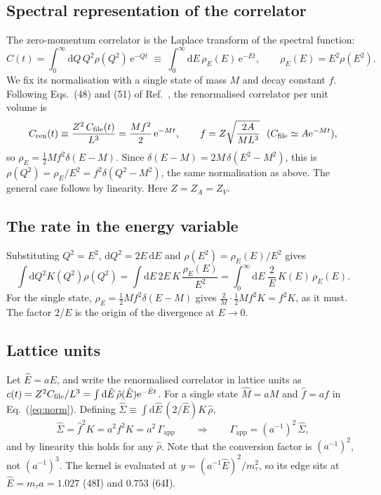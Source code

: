 \documentclass[11pt]{article}
\newcommand{\dd}{\mathrm{d}}
\newcommand{\ee}{\mathrm{e}}
\newcommand{\Gapp}{\Gamma_{\mathrm{app}}}
\theoremstyle{remark}
\begin{document}
\subsection{Spectral representation of the correlator}
The zero-momentum correlator is the Laplace transform of the spectral function:
\begin{equation}
 C(t)=\int_0^\infty\dd Q\,Q^2\rho(Q^2)\,\ee^{-Qt}\;\equiv\;\int_0^\infty\dd E\,\rho_E(E)\,\ee^{-Et},\qquad \rho_E(E)=E^2\rho(E^2).
 \label{eq:spec}
\end{equation}
We fix its normalisation with a single state of mass $M$ and decay constant $f$. Following Eqs.~(48) and (51) of Ref.~\cite{Chen:TauNote}, the renormalised correlator per unit volume is
\begin{equation}
 C_{\rm ren}(t)\equiv\frac{Z^2\,C_{\rm file}(t)}{L^3}=\frac{Mf^2}{2}\,\ee^{-Mt},
 \qquad f=Z\sqrt{\frac{2A}{ML^3}}\ \ (C_{\rm file}\simeq A\ee^{-Mt}),
 \label{eq:norm}
\end{equation}
so $\rho_E=\tfrac12Mf^2\delta(E-M)$. Since $\delta(E-M)=2M\,\delta(E^2-M^2)$, this is
$\rho(Q^2)=\rho_E/E^2=f^2\delta(Q^2-M^2)$, the same normalisation as above. The general case follows by linearity. Here $Z=Z_A=Z_V$.

\subsection{The rate in the energy variable}
Substituting $Q^2=E^2$, $\dd Q^2=2E\,\dd E$ and $\rho(E^2)=\rho_E(E)/E^2$ gives
\begin{equation}
 \int\dd Q^2K(Q^2)\rho(Q^2)=\int\dd E\,2E\,K\,\frac{\rho_E(E)}{E^2}=\int_0^\infty\dd E\;\frac{2}{E}\,K(E)\,\rho_E(E).
 \label{eq:Gapp_E}
\end{equation}
For the single state, $\rho_E=\tfrac12Mf^2\delta(E-M)$ gives $\frac{2}{M}\cdot\frac12Mf^2K=f^2K$, as it must. The factor $2/E$ is the origin of the divergence at $E\to0$.

\subsection{Lattice units}
Let $\hat E=aE$, and write the renormalised correlator in lattice units as $c(t)=Z^2C_{\rm file}/L^3=\int\dd\hat E\,\hat\rho(\hat E)\ee^{-\hat Et}$.
For a single state $\hat M=aM$ and $\hat f=af$ in Eq.~(\ref{eq:norm}). Defining $\hat\Sigma\equiv\int\dd\hat E\,(2/\hat E)K\,\hat\rho$,
\begin{equation}
 \hat\Sigma=\hat f^2K=a^2f^2K=a^2\,\Gapp
 \qquad\Longrightarrow\qquad \Gapp=(a^{-1})^2\,\hat\Sigma ,
 \label{eq:units}
\end{equation}
and by linearity this holds for any $\hat\rho$. Note that the conversion factor is $(a^{-1})^2$, not $(a^{-1})^3$. The kernel is evaluated at
$y=(a^{-1}\hat E)^2/m_\tau^2$, so its edge sits at $\hat E=m_\tau a=1.027$ (48I) and $0.753$ (64I).
\end{document}
